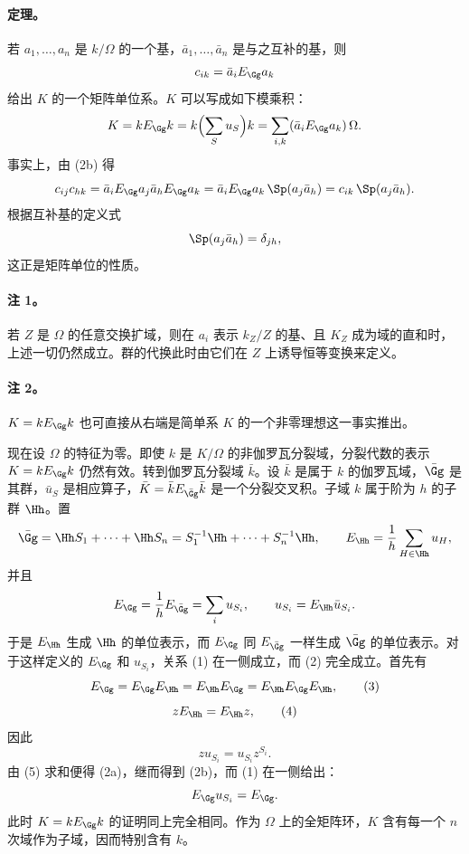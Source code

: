 \paragraph{定理。}
若 \(a_1,\ldots,a_n\) 是 \(k/\Omega\) 的一个基，\(\bar a_1,\ldots,\bar a_n\) 是与之互补的基，则
\[
        c_{ik}=\bar a_iE_\Gg a_k
\]
给出 \(K\) 的一个矩阵单位系。\(K\) 可以写成如下模乘积：
\[
        K=kE_\Gg k
          =k\Bigl(\sum_Su_S\Bigr)k
          =\sum_{i,k}(\bar a_iE_\Gg a_k)\,\Omega .
\]
事实上，由 (2b) 得
\[
        c_{ij}c_{hk}
        =\bar a_iE_\Gg a_j\bar a_hE_\Gg a_k
        =\bar a_iE_\Gg a_k\,\Sp(a_j\bar a_h)
        =c_{ik}\,\Sp(a_j\bar a_h).
\]
根据互补基的定义式
\[
        \Sp(a_j\bar a_h)=\delta_{jh},
\]
这正是矩阵单位的性质。

\paragraph{注 1。}
若 \(Z\) 是 \(\Omega\) 的任意交换扩域，则在 \(a_i\) 表示 \(k_Z/Z\) 的基、且 \(K_Z\) 成为域的直和时，上述一切仍然成立。群的代换此时由它们在 \(Z\) 上诱导恒等变换来定义。

\paragraph{注 2。}
\(K=kE_\Gg k\) 也可直接从右端是简单系 \(K\) 的一个非零理想这一事实推出。

现在设 \(\Omega\) 的特征为零。即使 \(k\) 是 \(K/\Omega\) 的非伽罗瓦分裂域，分裂代数的表示 \(K=kE_\Gg k\) 仍然有效。转到伽罗瓦分裂域 \(\bar k\)。设 \(\bar k\) 是属于 \(k\) 的伽罗瓦域，\(\bar\Gg\) 是其群，\(\bar u_S\) 是相应算子，\(\bar K=\bar kE_{\bar\Gg}\bar k\) 是一个分裂交叉积。子域 \(k\) 属于阶为 \(h\) 的子群 \(\Hh\)。置
\[
        \bar\Gg=\Hh S_1+\cdots+\Hh S_n
              =S_1^{-1}\Hh+\cdots+S_n^{-1}\Hh,
        \qquad
        E_\Hh=\frac1h\sum_{H\in\Hh}u_H,
\]
并且
\[
        E_\Gg=\frac1h E_{\bar\Gg}
              =\sum_i u_{S_i},\qquad
        u_{S_i}=E_\Hh\bar u_{S_i}.
\]
于是 \(E_\Hh\) 生成 \(\Hh\) 的单位表示，而 \(E_\Gg\) 同 \(E_{\bar\Gg}\) 一样生成 \(\bar\Gg\) 的单位表示。对于这样定义的 \(E_\Gg\) 和 \(u_{S_i}\)，关系 (1) 在一侧成立，而 (2) 完全成立。首先有
\[
        E_\Gg=E_\Gg E_\Hh=E_\Hh E_\Gg=E_\Hh E_\Gg E_\Hh,       \tag{3}
\]
\[
        zE_\Hh=E_\Hh z,                                      \tag{4}
\]
因此
\[
        z u_{S_i}=u_{S_i}z^{S_i}.                            \tag{5}
\]
由 (5) 求和便得 (2a)，继而得到 (2b)，而 (1) 在一侧给出：
\[
        E_\Gg u_{S_i}=E_\Gg .
\]
此时 \(K=kE_\Gg k\) 的证明同上完全相同。作为 \(\Omega\) 上的全矩阵环，\(K\) 含有每一个 \(n\) 次域作为子域，因而特别含有 \(k\)。


